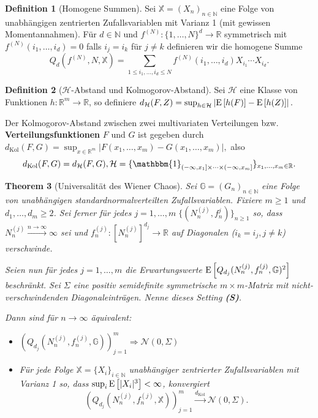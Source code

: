 \documentclass[11pt, ngerman]{scrartcl}
\theoremstyle{definition}
\newtheorem{definition}{Definition}
\theoremstyle{plain}
\newtheorem{theorem}[definition]{Theorem}
\newcommand{\R}[0]{\mathbb{R}}
\newcommand{\N}[0]{\mathbb{N}}
\newcommand{\indicator}[1]{\mathbbm{1}_{#1}}
\newcommand{\E}[1][]{%
    \operatorname{E}%
    \ifx\\#1\\\else%
        \left[#1\right]%
    \fi%
}
\newcommand{\<}{\langle}
\renewcommand{\>}{\rangle}
\begin{document}
\begin{definition}[Homogene Summen]
 Sei $\mathbb{X} = (X_n)_{n \in \N}$ eine Folge von unabhängigen zentrierten Zufallsvariablen mit Varianz 1 (mit gewissen Momentannahmen). 
        Für $d \in \N$ und $f^{(N)}: \{1, \ldots, N\}^d \to \R$ symmetrisch mit $f^{(N)}(i_1, \ldots, i_d) = 0$ falls $i_j = i_k$ für $j \neq k$ definieren wir die homogene Summe
        \[
        Q_d(f^{(N)}, N, \mathbb{X}) = \sum_{1 \leq i_1, \ldots, i_d \leq N} f^{(N)}(i_1, \ldots, i_d) X_{i_1} \cdots X_{i_d}.
        \]
\end{definition}
\begin{definition}[$\mathcal{H}$-Abstand und Kolmogorov-Abstand]
        Sei $\mathcal{H}$ eine Klasse von Funktionen $h: \R^m \to \R$, so definiere
            $d_{\mathcal{H}}(F, Z) = \sup_{h \in \mathcal{H}} \left|\E[h(F)]- \E[h(Z)]\right|.$

        Der Kolmogorov-Abstand zwischen zwei multivariaten Verteilungen bzw. \textbf{Verteilungsfunktionen} $F$ und $G$ ist gegeben durch $
        d_{\text{Kol}}(F,G) = \sup_{x \in \R^m} |F(x_1, \ldots, x_m) - G(x_1, \ldots, x_m)|,$
        also 
        \[
            d_{\text{Kol}}(F,G) = d_{\mathcal{H}}(F,G), \mathcal{H} = \{\indicator{(-\infty, x_1]\times \cdots \times (-\infty, x_m]}\}_{x_1, \ldots, x_m \in \R}.
        \]
    \end{definition}
\begin{theorem}[Universalität des Wiener Chaos]
        Sei $\mathbb{G} = (G_n)_{n \in \N}$ eine Folge von unabhängigen standardnormalverteilten Zufallsvariablen. 
        Fixiere $m \geq 1$ und $d_1, \ldots, d_m \geq 2$. Sei ferner für jedes $j = 1, \ldots, m \; \{(N_n^{(j)}, f_n^{j})\}_{n \geq 1}$ so, dass $N_n^{(j)} \overset{n \to \infty}{\longrightarrow} \infty$ sei und $f_n^{(j)}: [N_n^{(j)}]^{d_j} \to \R$ auf Diagonalen ($i_k = i_j , j \neq k$) verschwinde. 

        Seien nun für jedes $j = 1, \ldots, m$ die Erwartungswerte $\E[Q_{d_j}(N_n^{(j)}, f_n^{(j)}, \mathbb{G})^2]$ beschränkt. 
        Sei $\Sigma$ eine positiv semidefinite symmetrische $m\times m$-Matrix mit nicht-verschwindenden Diagonaleinträgen. Nenne dieses Setting \textbf{(S)}.

        Dann sind für $n \to \infty$ äquivalent: 
        \begin{itemize}
            \item[(1)] $\left(Q_{d_j}(N_n^{(j)}, f_n^{(j)}, \mathbb{G})\right)_{j=1}^m \Longrightarrow \mathcal{N}(0, \Sigma)$
            \item[(2)]  Für jede Folge $\mathbb{X} = \{X_i\}_{i \in \N}$ unabhängiger zentrierter Zufallsvariablen mit Varianz 1 so, dass $\sup_{i} \E[|X_i|^3] < \infty$, konvergiert \[
                \left(Q_{d_j}(N_n^{(j)}, f_n^{(j)}, \mathbb{X})\right)_{j=1}^m \overset{d_{\text{Kol}}}{\longrightarrow} \mathcal{N}(0, \Sigma).
            \]
        \end{itemize}
    \end{theorem}
\end{document}
